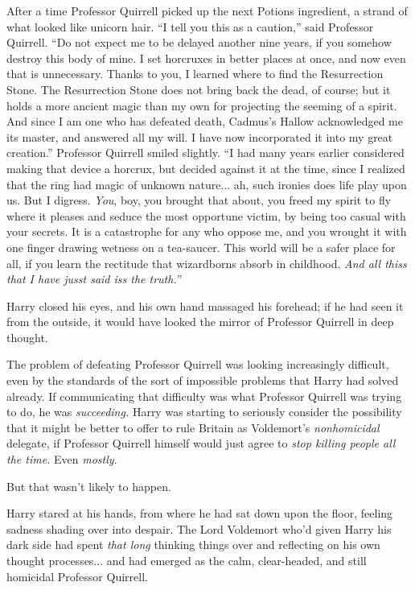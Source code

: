 After a time Professor Quirrell picked up the next Potions ingredient, a strand of what looked like unicorn hair. ``I tell you this as a caution,'' said Professor Quirrell. ``Do not expect me to be delayed another nine years, if you somehow destroy this body of mine. I set horcruxes in better places at once, and now even that is unnecessary. Thanks to you, I learned where to find the Resurrection Stone. The Resurrection Stone does not bring back the dead, of course; but it holds a more ancient magic than my own for projecting the seeming of a spirit. And since I am one who has defeated death, Cadmus's Hallow acknowledged me its master, and answered all my will. I have now incorporated it into my great creation.'' Professor Quirrell smiled slightly. ``I had many years earlier considered making that device a horcrux, but decided against it at the time, since I realized that the ring had magic of unknown nature... ah, such ironies does life play upon us. But I digress. \emph{You}, boy, you brought that about, you freed my spirit to fly where it pleases and seduce the most opportune victim, by being too casual with your secrets. It is a catastrophe for any who oppose me, and you wrought it with one finger drawing wetness on a tea-saucer. This world will be a safer place for all, if you learn the rectitude that wizardborns absorb in childhood. \emph{And all thiss that I have jusst said iss the truth.}''

Harry closed his eyes, and his own hand massaged his forehead; if he had seen it from the outside, it would have looked the mirror of Professor Quirrell in deep thought.

The problem of defeating Professor Quirrell was looking increasingly difficult, even by the standards of the sort of impossible problems that Harry had solved already. If communicating that difficulty was what Professor Quirrell was trying to do, he was \emph{succeeding.} Harry was starting to seriously consider the possibility that it might be better to offer to rule Britain as Voldemort's \emph{nonhomicidal} delegate, if Professor Quirrell himself would just agree to \emph{stop killing people all the time.} Even \emph{mostly}.

But that wasn't likely to happen.

Harry stared at his hands, from where he had sat down upon the floor, feeling sadness shading over into despair. The Lord Voldemort who'd given Harry his dark side had spent \emph{that long} thinking things over and reflecting on his own thought processes... and had emerged as the calm, clear-headed, and still homicidal Professor Quirrell.

